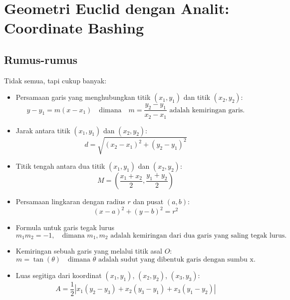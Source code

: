 \documentclass[12pt]{scrartcl}
\begin{document}
\newpage
\section{Geometri Euclid dengan Analit: Coordinate Bashing}
\subsection{Rumus-rumus}
Tidak semua, tapi cukup banyak:
\begin{itemize}
    \item Persamaan garis yang menghubungkan titik $(x_1, y_1)$ dan titik $(x_2, y_2)$:
    \[ y - y_1 = m(x - x_1) \quad \text{dimana} \quad m = \frac{y_2 - y_1}{x_2 - x_1} \text{ adalah kemiringan garis.} \]
    
    \item Jarak antara titik $(x_1, y_1)$ dan $(x_2, y_2)$:
    \[ d = \sqrt{(x_2 - x_1)^2 + (y_2 - y_1)^2} \]
    
    \item Titik tengah antara dua titik $(x_1, y_1)$ dan $(x_2, y_2)$:
    \[ M = \left(\frac{x_1 + x_2}{2}, \frac{y_1 + y_2}{2}\right) \]
    
    \item Persamaan lingkaran dengan radius $r$ dan pusat $(a, b)$:
    \[ (x - a)^2 + (y - b)^2 = r^2 \]
    
    \item Formula untuk garis tegak lurus
    \[ m_1m_2 = -1, \quad \text{dimana } m_1, m_2 \text{ adalah kemiringan dari dua garis yang saling tegak lurus.} \]
    
    \item Kemiringan sebuah garis yang melalui titik asal $O$:
    \[ m = \tan(\theta) \quad \text{dimana } \theta \text{ adalah sudut yang dibentuk garis dengan sumbu x.} \]
    
    \item Luas segitiga dari koordinat $(x_1, y_1)$, $(x_2, y_2)$, $(x_3, y_3)$:
    \[ A = \frac{1}{2} 
    \left| 
    x_1(y_2 - y_3) + x_2(y_3 - y_1) + x_3(y_1 - y_2) 
    \right| \]
\end{itemize}
\end{document}

